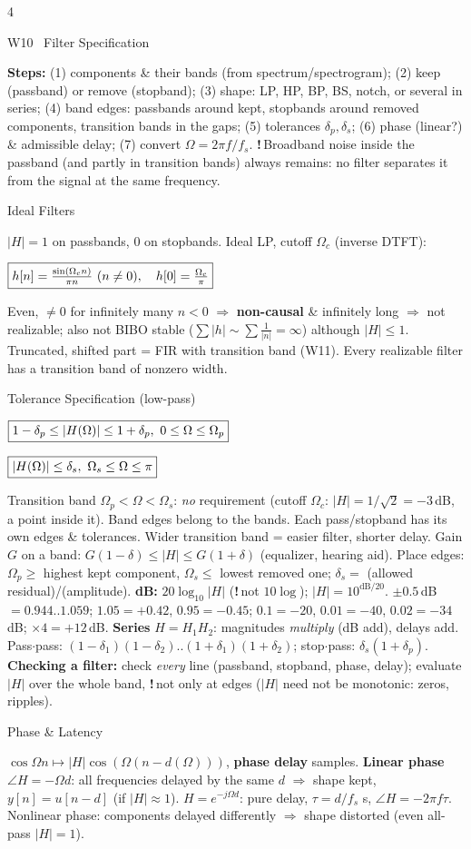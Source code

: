 \documentclass[a4paper,landscape]{article}
\newcommand{\sect}[1]{\par\vspace{1pt}\noindent\colorbox{secblue}{\parbox{\dimexpr\linewidth-2\fboxsep}{\color{white}\bfseries\fontsize{6.8}{7.6}\selectfont\strut #1}}\par\vspace{0.4pt}}
\newcommand{\sub}[1]{\par\vspace{0.6pt}\noindent\colorbox{subblue}{\parbox{\dimexpr\linewidth-2\fboxsep}{\bfseries\strut #1}}\par\vspace{0.2pt}}
\newcommand{\warn}[1]{{\color{warnred}\textbf{!}\,#1}}
\newcommand{\bx}[1]{\fbox{$\textstyle #1$}}
\newcommand{\eqc}[1]{\par\vspace{0.2pt}\centerline{$#1$}\par\vspace{0.2pt}}
\begin{document}
\begin{multicols*}{4}
\sect{W10 \ Filter Specification}
\textbf{Steps:} (1) components \& their bands (from spectrum/spectrogram); (2) keep (passband) or remove (stopband); (3) shape: LP, HP, BP, BS, notch, or several in series; (4) band edges: passbands around kept, stopbands around removed components, transition bands in the gaps; (5) tolerances $\delta_p,\delta_s$; (6) phase (linear?) \& admissible delay; (7) convert $\Omega=2\pi f/f_s$.
\warn{Broadband noise inside the passband (and partly in transition bands) always remains: no filter separates it from the signal at the same frequency.}
\sub{Ideal Filters}
$|H|=1$ on passbands, $0$ on stopbands. Ideal LP, cutoff $\Omega_c$ (inverse DTFT):
\eqc{\bx{h[n]=\frac{\sin(\Omega_cn)}{\pi n}\ (n\ne0),\quad h[0]=\frac{\Omega_c}{\pi}}}
Even, $\ne0$ for infinitely many $n<0$ $\Rightarrow$ \textbf{non-causal} \& infinitely long $\Rightarrow$ not realizable; also not BIBO stable ($\sum|h|\sim\sum\frac1{|n|}=\infty$) although $|H|\le1$. Truncated, shifted part = FIR with transition band (W11). Every realizable filter has a transition band of nonzero width.
\sub{Tolerance Specification (low-pass)}
\eqc{\bx{1-\delta_p\le|H(\Omega)|\le1+\delta_p,\ 0\le\Omega\le\Omega_p}}
\eqc{\bx{|H(\Omega)|\le\delta_s,\ \Omega_s\le\Omega\le\pi}}
Transition band $\Omega_p<\Omega<\Omega_s$: \emph{no} requirement (cutoff $\Omega_c$: $|H|=1/\sqrt2=-3$\,dB, a point inside it). Band edges belong to the bands. Each pass/stopband has its own edges \& tolerances. Wider transition band = easier filter, shorter delay. Gain $G$ on a band: $G(1-\delta)\le|H|\le G(1+\delta)$ (equalizer, hearing aid).
Place edges: $\Omega_p\ge$ highest kept component, $\Omega_s\le$ lowest removed one; $\delta_s=$ (allowed residual)/(amplitude).
\textbf{dB:} $20\log_{10}|H|$ (\warn{not $10\log$}); $|H|=10^{\text{dB}/20}$. $\pm0.5$\,dB $=0.944..1.059$; $1.05=+0.42$, $0.95=-0.45$; $0.1=-20$, $0.01=-40$, $0.02=-34$\,dB; $\times4=+12$\,dB.
\textbf{Series} $H=H_1H_2$: magnitudes \emph{multiply} (dB add), delays add. Pass$\cdot$pass: $(1{-}\delta_1)(1{-}\delta_2)..(1{+}\delta_1)(1{+}\delta_2)$; stop$\cdot$pass: $\delta_s(1+\delta_p)$.
\textbf{Checking a filter:} check \emph{every} line (passband, stopband, phase, delay); evaluate $|H|$ over the whole band, \warn{not only at edges} ($|H|$ need not be monotonic: zeros, ripples).
\sub{Phase \& Latency}
$\cos\Omega n\mapsto|H|\cos(\Omega(n-d(\Omega)))$, \textbf{phase delay} \bx{d(\Omega)=-\angle H(\Omega)/\Omega} samples.
\textbf{Linear phase} $\angle H=-\Omega d$: all frequencies delayed by the same $d$ $\Rightarrow$ shape kept, $y[n]=u[n{-}d]$ (if $|H|\approx1$). $H=e^{-j\Omega d}$: pure delay, $\tau=d/f_s$ s, $\angle H=-2\pi f\tau$. Nonlinear phase: components delayed differently $\Rightarrow$ shape distorted (even all-pass $|H|=1$).

\end{multicols*}
\end{document}
